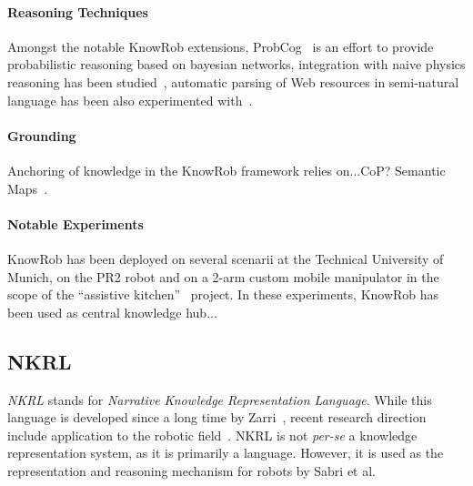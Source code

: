 \paragraph{Reasoning Techniques} Amongst the notable {\sc KnowRob} extensions,
{\sc ProbCog}~\cite{Jain2009} is an effort to provide probabilistic reasoning
based on bayesian networks, integration with naive physics reasoning has been
studied~\cite{Kunze2011a}, automatic parsing of Web resources in semi-natural
language has been also experimented with~\cite{Nyga2009}.

\paragraph{Grounding} Anchoring of knowledge in the {\sc KnowRob} framework
relies on...CoP? Semantic Maps~\cite{Blodow2011}.



\paragraph{Notable Experiments} {\sc KnowRob} has been deployed on several
scenarii at the Technical University of Munich, on the PR2 robot and on a 2-arm
custom mobile manipulator in the scope of the ``assistive
kitchen''~\cite{Beetz2008} project. In these experiments, {\sc KnowRob} has
been used as central knowledge hub...

\subsection{NKRL}
\label{sect|nkrl}

\emph{NKRL} stands for \emph{Narrative Knowledge Representation Language}.
While this language is developed since a long time by Zarri~\cite{Zarri1997,
Zarri2008}, recent research direction include application to the robotic
field~\cite{Sabri2011}. NKRL is not {\it per-se} a knowledge representation
system, as it is primarily a language. However, it is used as the
representation and reasoning mechanism for robots by Sabri et al.


